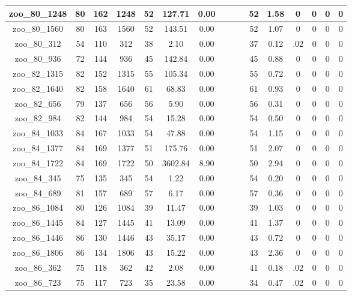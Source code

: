 \begin{landscape}
\begin{longtable}{|c|c|c|c|c|c|c|c|c|c|c|c|c|c|c|c|}
zoo\_80\_1248 & 80 & 162 & 1248 & 52 & 127.71 & 0.00 &  &  &  & 52 & 1.58 & 0 & 0 & 0 & 0 \\ \hline 
zoo\_80\_1560 & 80 & 163 & 1560 & 52 & 143.51 & 0.00 &  &  &  & 52 & 1.07 & 0 & 0 & 0 & 0 \\ \hline 
zoo\_80\_312 & 54 & 110 & 312 & 38 & 2.10 & 0.00 &  &  &  & 37 & 0.12 & .02 & 0 & 0 & 0 \\ \hline 
zoo\_80\_936 & 72 & 144 & 936 & 45 & 142.84 & 0.00 &  &  &  & 45 & 0.88 & 0 & 0 & 0 & 0 \\ \hline 
zoo\_82\_1315 & 82 & 152 & 1315 & 55 & 105.34 & 0.00 &  &  &  & 55 & 0.72 & 0 & 0 & 0 & 0 \\ \hline 
zoo\_82\_1640 & 82 & 158 & 1640 & 61 & 68.83 & 0.00 &  &  &  & 61 & 0.93 & 0 & 0 & 0 & 0 \\ \hline 
zoo\_82\_656 & 79 & 137 & 656 & 56 & 5.90 & 0.00 &  &  &  & 56 & 0.31 & 0 & 0 & 0 & 0 \\ \hline 
zoo\_82\_984 & 82 & 144 & 984 & 54 & 15.28 & 0.00 &  &  &  & 54 & 0.50 & 0 & 0 & 0 & 0 \\ \hline 
zoo\_84\_1033 & 84 & 167 & 1033 & 54 & 47.88 & 0.00 &  &  &  & 54 & 1.15 & 0 & 0 & 0 & 0 \\ \hline 
zoo\_84\_1377 & 84 & 169 & 1377 & 51 & 175.76 & 0.00 &  &  &  & 51 & 2.07 & 0 & 0 & 0 & 0 \\ \hline 
zoo\_84\_1722 & 84 & 169 & 1722 & 50 & 3602.84 & 8.90 &  &  &  & 50 & 2.94 & 0 & 0 & 0 & 0 \\ \hline 
zoo\_84\_345 & 75 & 135 & 345 & 54 & 1.22 & 0.00 &  &  &  & 54 & 0.20 & 0 & 0 & 0 & 0 \\ \hline 
zoo\_84\_689 & 81 & 157 & 689 & 57 & 6.17 & 0.00 &  &  &  & 57 & 0.36 & 0 & 0 & 0 & 0 \\ \hline 
zoo\_86\_1084 & 80 & 126 & 1084 & 39 & 11.47 & 0.00 &  &  &  & 39 & 1.03 & 0 & 0 & 0 & 0 \\ \hline 
zoo\_86\_1445 & 84 & 127 & 1445 & 41 & 13.09 & 0.00 &  &  &  & 41 & 1.37 & 0 & 0 & 0 & 0 \\ \hline 
zoo\_86\_1446 & 86 & 130 & 1446 & 43 & 35.17 & 0.00 &  &  &  & 43 & 0.72 & 0 & 0 & 0 & 0 \\ \hline 
zoo\_86\_1806 & 86 & 134 & 1806 & 43 & 15.22 & 0.00 &  &  &  & 43 & 2.36 & 0 & 0 & 0 & 0 \\ \hline 
zoo\_86\_362 & 75 & 118 & 362 & 42 & 2.08 & 0.00 &  &  &  & 41 & 0.18 & .02 & 0 & 0 & 0 \\ \hline 
zoo\_86\_723 & 75 & 117 & 723 & 35 & 23.58 & 0.00 &  &  &  & 34 & 0.47 & .02 & 0 & 0 & 0 \\ \hline 

\end{longtable}
\end{landscape}

